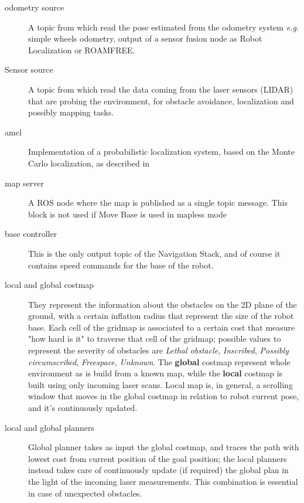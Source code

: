 \begin{description}
	\item[odometry source] A topic from which read the pose estimated from the odometry system \textit{e.g.} simple wheels odometry, output of a sensor fusion node as Robot Localization or ROAMFREE.
	\item[Sensor source] A topic from which read the data coming from the laser sensors (\ac{LIDAR}) that are probing the environment, for obstacle avoidance, localization and possibly mapping tasks.
	\item[amcl] Implementation of a probabilistic localization system, based on the Monte Carlo localization, as described in \cite{monteCarloLocalization}
	\item[map server] A \ac{ROS} node where the map is published as a single topic message. This block is not used if Move Base is used in mapless mode 
	\item[base controller] This is the only output topic of the Navigation Stack, and of course it contains speed commands for the base of the robot.
	\item[local and global costmap] They represent the information about the obstacles on the 2D plane of the ground, with a certain inflation radius that represent the size of the robot base. Each cell of the gridmap is associated to a certain cost that measure "how hard is it" to traverse that cell of the gridmap; possible values to represent the severity of obstacles are \textit{Lethal obstacle}, \textit{Inscribed}, \textit{Possibly circumscribed}, \textit{Freespace}, \textit{Unknown}. The \textbf{global} costmap represent whole environment as is build from a known map, while the \textbf{local} costmap is built using only incoming laser scans. Local map is, in general, a scrolling window that moves in the global costmap in relation to robot current pose, and it's continuously updated.
	\item[local and global planners] Global planner takes as input the global costmap, and traces the path with lowest cost from current position of the goal position; the local planners instead takes care of continuously update (if required) the global plan in the light of the incoming laser measurements. This combination is essential in case of unexpected obstacles.
\end{description}


